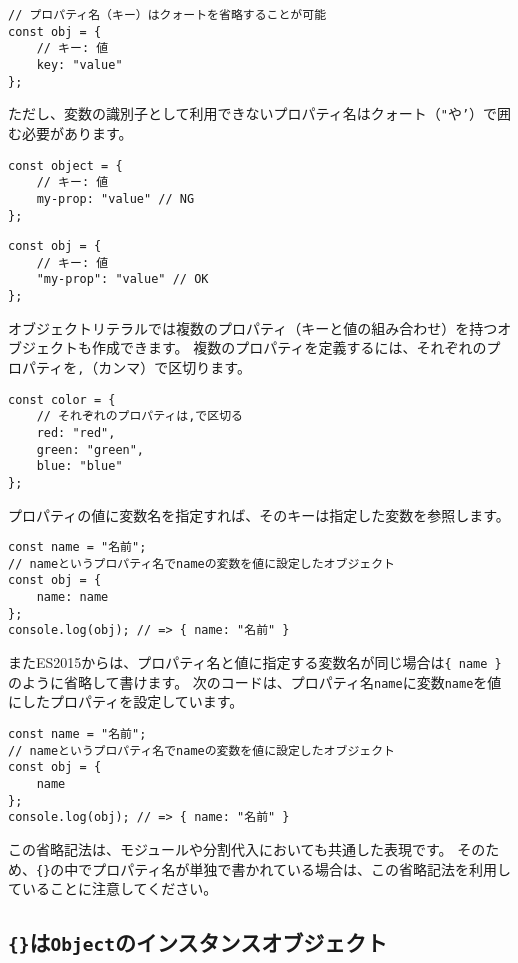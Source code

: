\begin{lstlisting}
// プロパティ名（キー）はクォートを省略することが可能
const obj = {
    // キー: 値
    key: "value"
};
\end{lstlisting}

ただし、変数の識別子として利用できないプロパティ名はクォート（\texttt{"}や\texttt{'}）で囲む必要があります。

\begin{lstlisting}
const object = {
    // キー: 値
    my-prop: "value" // NG
};
\end{lstlisting}

\begin{lstlisting}
const obj = {
    // キー: 値
    "my-prop": "value" // OK
};
\end{lstlisting}

オブジェクトリテラルでは複数のプロパティ（キーと値の組み合わせ）を持つオブジェクトも作成できます。
複数のプロパティを定義するには、それぞれのプロパティを\texttt{,}（カンマ）で区切ります。

\begin{lstlisting}
const color = {
    // それぞれのプロパティは,で区切る
    red: "red",
    green: "green",
    blue: "blue"
};
\end{lstlisting}

プロパティの値に変数名を指定すれば、そのキーは指定した変数を参照します。

\begin{lstlisting}
const name = "名前";
// nameというプロパティ名でnameの変数を値に設定したオブジェクト
const obj = {
    name: name
};
console.log(obj); // => { name: "名前" }
\end{lstlisting}

またES2015からは、プロパティ名と値に指定する変数名が同じ場合は\texttt{\{ name \}}のように省略して書けます。
次のコードは、プロパティ名\texttt{name}に変数\texttt{name}を値にしたプロパティを設定しています。

\begin{lstlisting}
const name = "名前";
// nameというプロパティ名でnameの変数を値に設定したオブジェクト
const obj = {
    name
};
console.log(obj); // => { name: "名前" }
\end{lstlisting}

この省略記法は、モジュールや分割代入においても共通した表現です。
そのため、\texttt{\{\}}の中でプロパティ名が単独で書かれている場合は、この省略記法を利用していることに注意してください。

\hypertarget{object-instance-object}{%
\subsection{\texorpdfstring{\texttt{\{\}}は\texttt{Object}のインスタンスオブジェクト}{\{\}はObjectのインスタンスオブジェクト}}\label{object-instance-object}}

